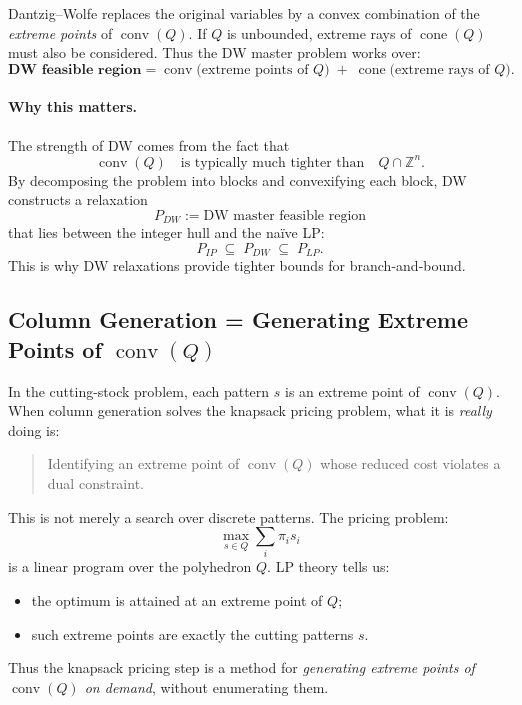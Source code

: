 \documentclass[11pt]{article}
\begin{document}
Dantzig--Wolfe replaces the original variables by a convex combination of the
\emph{extreme points} of $\operatorname{conv}(Q)$.
If $Q$ is unbounded, extreme rays of $\operatorname{cone}(Q)$ must also be
considered.
Thus the DW master problem works over:
\[
    \textbf{DW feasible region} = 
    \operatorname{conv}\bigl(\text{extreme points of } Q\bigr)
    \;+\;
    \operatorname{cone}\bigl(\text{extreme rays of } Q\bigr).
\]

\paragraph{Why this matters.}
The strength of DW comes from the fact that
\[
    \operatorname{conv}(Q)
    \quad\text{is typically much tighter than}\quad
    Q \cap \mathbb{Z}^n.
\]
By decomposing the problem into blocks and convexifying each block,
DW constructs a relaxation
\[
    P_{DW} := \text{DW master feasible region}
\]
that lies between the integer hull and the naïve LP:
\[
    P_{IP} \;\subseteq\; P_{DW} \;\subseteq\; P_{LP}.
\]
This is why DW relaxations provide tighter bounds for branch-and-bound.

\subsection{Column Generation = Generating Extreme Points of $\operatorname{conv}(Q)$}

In the cutting-stock problem, each pattern $s$ is an extreme point of 
$\operatorname{conv}(Q)$.
When column generation solves the knapsack pricing problem, what it is
\emph{really} doing is:

\begin{quote}
    Identifying an extreme point of $\operatorname{conv}(Q)$ whose reduced
    cost violates a dual constraint.
\end{quote}

This is not merely a search over discrete patterns.
The pricing problem:
\[
    \max_{s \in Q} \sum_i \pi_i s_i
\]
is a linear program over the polyhedron $Q$.
LP theory tells us:
\begin{itemize}
    \item the optimum is attained at an extreme point of $Q$;
    \item such extreme points are exactly the cutting patterns $s$.
\end{itemize}

Thus the knapsack pricing step is a method for \emph{generating extreme points
of $\operatorname{conv}(Q)$ on demand}, without enumerating them.
\end{document}

